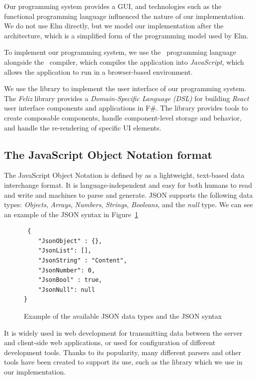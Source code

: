 Our programming system provides a GUI, and technologies such as the~\citet{elm} functional programming language influenced the nature of our implementation.
We do not use Elm directly, but we model our implementation after the~\citet{elm-arch} architecture, which is a simplified form of the programming model used by Elm.

To implement our programming system, we use the~\citet{fsharp} programming language alongside the~\citet{fable} compiler, which compiles the application into \emph{JavaScript},
which allows the application to run in a browser-based environment.

We use the \citet{feliz} library to implement the user interface of our programming system.
The \emph{Feliz} library provides a \emph{Domain-Specific Language (DSL)} for building \emph{React} user interface components and applications in F\#.
The \citet{react} library provides tools to create composable components, handle component-level storage and behavior, and handle the re-rendering of specific UI elements.

\subsection{The JavaScript Object Notation format}
The JavaScript Object Notation is defined by \citet{rfc8259} as a lightweight, text-based data interchange format.
It is language-independent and easy for both humans to read and write and machines to parse and generate.
JSON supports the following data types: \emph{Objects}, \emph{Arrays}, \emph{Numbers}, \emph{Strings}, \emph{Booleans}, and the \emph{null} type.
We can see an example of the JSON syntax in Figure~\ref{fig:json-example}

\begin{figure}[htbp]
	\caption {Example of the available JSON data types and the JSON syntax}
	\label{fig:json-example}
	\begin{lstlisting}
 { 
    "JsonObject" : {},
    "JsonList": [],
    "JsonString" : "Content",
    "JsonNumber": 0,
    "JsonBool" : true,
    "JsonNull": null
}
  \end{lstlisting}
\end{figure}

It is widely used in web development for transmitting data between the server and client-side web applications,
or used for configuration of different development tools.
Thanks to its popularity, many different parsers and other tools have been created to support its use, such as the \citet{simpleJson} library which we use in our implementation.

